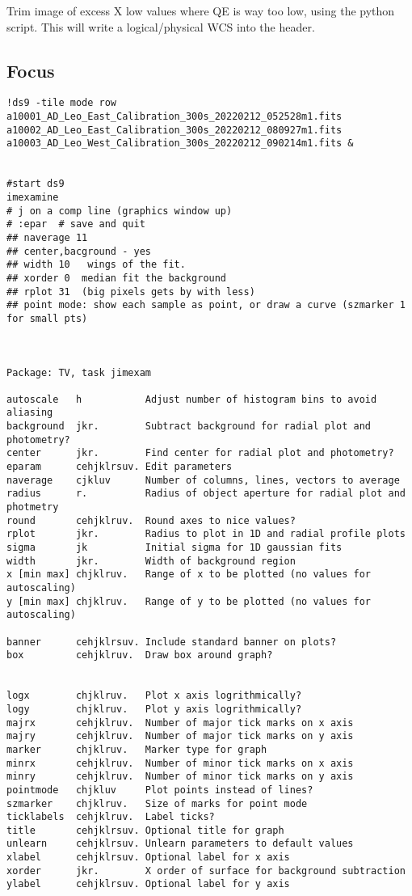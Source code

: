 Trim image of excess X low values where QE is way too low, using the
python script. This will write a logical/physical WCS into the header.

\subsection{Focus}

\begingroup \fontsize{10pt}{10pt}
\selectfont
\begin{verbatim} 
!ds9 -tile mode row a10001_AD_Leo_East_Calibration_300s_20220212_052528m1.fits       a10002_AD_Leo_East_Calibration_300s_20220212_080927m1.fits a10003_AD_Leo_West_Calibration_300s_20220212_090214m1.fits &


#start ds9 
imexamine  
# j on a comp line (graphics window up)
# :epar  # save and quit
## naverage 11
## center,bacground - yes
## width 10   wings of the fit.
## xorder 0  median fit the background
## rplot 31  (big pixels gets by with less)
## point mode: show each sample as point, or draw a curve (szmarker 1 for small pts)



Package: TV, task jimexam

autoscale   h           Adjust number of histogram bins to avoid aliasing
background  jkr.        Subtract background for radial plot and photometry?
center      jkr.        Find center for radial plot and photometry?
eparam      cehjklrsuv. Edit parameters
naverage    cjkluv      Number of columns, lines, vectors to average
radius      r.          Radius of object aperture for radial plot and photmetry
round       cehjklruv.  Round axes to nice values?
rplot       jkr.        Radius to plot in 1D and radial profile plots
sigma       jk          Initial sigma for 1D gaussian fits
width       jkr.        Width of background region
x [min max] chjklruv.   Range of x to be plotted (no values for autoscaling)
y [min max] chjklruv.   Range of y to be plotted (no values for autoscaling)

banner      cehjklrsuv. Include standard banner on plots?
box         cehjklruv.  Draw box around graph?


logx        chjklruv.   Plot x axis logrithmically?
logy        chjklruv.   Plot y axis logrithmically?
majrx       cehjklruv.  Number of major tick marks on x axis
majry       cehjklruv.  Number of major tick marks on y axis
marker      chjklruv.   Marker type for graph
minrx       cehjklruv.  Number of minor tick marks on x axis
minry       cehjklruv.  Number of minor tick marks on y axis
pointmode   chjkluv     Plot points instead of lines?
szmarker    chjklruv.   Size of marks for point mode
ticklabels  cehjklruv.  Label ticks?
title       cehjklrsuv. Optional title for graph
unlearn     cehjklrsuv. Unlearn parameters to default values
xlabel      cehjklrsuv. Optional label for x axis
xorder      jkr.        X order of surface for background subtraction
ylabel      cehjklrsuv. Optional label for y axis
\end{verbatim}
\endgroup



